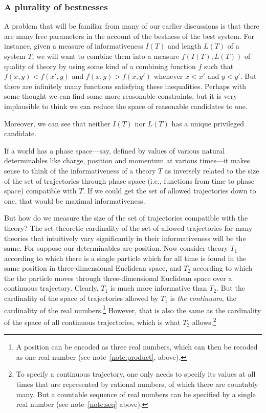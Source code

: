 \subsubsection{A plurality of bestnesses}
A problem that will be familiar from many of our earlier discussions is that there are many free parameters in the account of 
the bestness of the best system. For instance, given a measure of informativeness $I(T)$ and length $L(T)$ of a system
$T$, we will want to combine them into a measure $f(I(T),L(T))$ of quality of theory by using some kind
of a combining function $f$ such that $f(x,y)<f(x',y)$ 
and $f(x,y)>f(x,y')$ whenever $x<x'$ and $y<y'$. But there are infinitely many functions satisfying these inequalities. Perhaps
with some thought we can find some more reasonable constraints, but it is very implausible to think we can reduce the space
of reasonable candidates to one.

Moreover, we can see that neither $I(T)$ nor $L(T)$ has a unique privileged candidate.

If a world has a phase space---say, defined by values of various natural determinables like charge, position and momentum at various 
times---it makes sense to think of the informativeness of a theory $T$ as inversely related to the size of the set of trajectories through 
phase space (i.e., functions from time to phase space) compatible with $T$. If we could get the set of allowed trajectories down to one,
that would be maximal informativeness. 

But how do we measure the size of the set of trajectories compatible with the theory? The set-theoretic cardinality of the set of allowed
trajectories for many theories that intuitively vary significantly in their informativeness will be the same. For suppose our determinables
are position. Now consider theory $T_1$ according to which there is a single particle which for all time is found in the same position
in three-dimensional Euclidean space, and $T_2$ according to which the the particle moves through three-dimensional Euclidean space over
a continuous trajectory. Clearly, $T_1$ is much more informative than $T_2$. But the cardinality of the space of trajectories allowed by
$T_1$ is \textit{the continuum}, the cardinality of the real numbers.\footnote{A position can be encoded as three real numbers, which can then be recoded as one real number (see note~\ref{note:product}, above).} However, that is also
the same as the cardinality of the space of all continuous trajectories, which is what $T_2$ allows.\footnote{To specify a continuous
trajectory, one only needs to specify its values at all times that are represented by rational 
numbers, of which there are countably many. But a countable sequence of real numbers can be specified by a 
single real number (see note~\ref{note:seq} above).}

